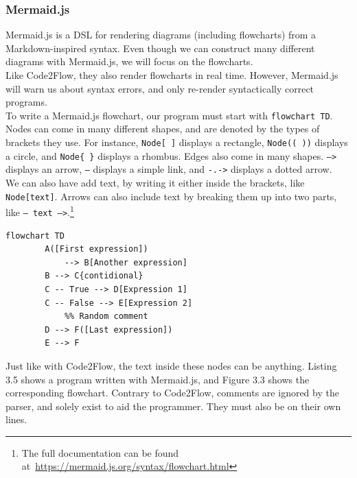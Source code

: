 \subsubsection{Mermaid.js}

Mermaid.js is a DSL for rendering diagrams (including flowcharts) from a Markdown-inspired syntax. Even though we can construct many different diagrams with Mermaid.js, we will focus on the flowcharts. \\

Like Code2Flow, they also render flowcharts in real time. However, Mermaid.js will warn us about syntax errors, and only re-render syntactically correct programs. \\

To write a Mermaid.js flowchart, our program must start with \texttt{flowchart TD}. Nodes can come in many different shapes, and are denoted by the types of brackets they use. For instance, \texttt{Node[ ]} displays a rectangle, \texttt{Node(( ))} displays a circle, and \texttt{Node\{ \}} displays a rhombus. Edges also come in many shapes. \texttt{-->} displays an arrow, \texttt{---} displays a simple link, and \texttt{-.->} displays a dotted arrow. \hfill \\

We can also have add text, by writing it either inside the brackets, like \texttt{Node[text]}. Arrows can also include text by breaking them up into two parts, like \texttt{-- text -->}.\footnote{The full documentation can be found at~\url{https://mermaid.js.org/syntax/flowchart.html}} \\

\begin{lstlisting}[caption={A mermaid.js program}, captionpos=b, frame=trbl]
    flowchart TD
        A([First expression])
            --> B[Another expression]
        B --> C{contidional}
        C -- True --> D[Expression 1]
        C -- False --> E[Expression 2]
            %% Random comment
        D --> F([Last expression])
        E --> F
\end{lstlisting}

Just like with Code2Flow, the text inside these nodes can be anything. Listing 3.5 shows a program written with Mermaid.js, and Figure 3.3 shows the corresponding flowchart. Contrary to Code2Flow, comments are ignored by the parser, and solely exist to aid the programmer. They must also be on their own lines. \\


